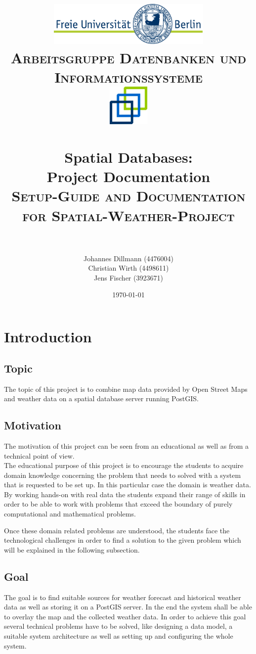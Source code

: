\documentclass[paper=a4, fontsize=11pt]{article} %
\title{
\normalfont \normalsize
\textsc{\includegraphics[width=0.6\textwidth]{pictures/logo} \\ [5pt] Arbeitsgruppe Datenbanken und Informationssysteme \\ [20pt] \includegraphics[width=0.15\textwidth]{pictures/DBIS_Logo_rgb_web.png}} \\ [10pt] %
\horrule{0.5pt} \\[0.4cm] %
\huge Spatial Databases:\\ Project Documentation \\ [0.15cm] %
\normalsize \textsc{Setup-Guide and Documentation for Spatial-Weather-Project} \\ [0.4cm]
\horrule{2pt} \\[0.5cm] %
}
\author{Johannes Dillmann (4476004) \\ Christian Wirth (4498611) \\ Jens Fischer (3923671)}
\date{\normalsize\today} %
\numberwithin{equation}{section} %
\numberwithin{figure}{section} %
\numberwithin{table}{section} %
\begin{document}
\begin{titlepage}
\maketitle
\thispagestyle{empty}
\end{titlepage}

\newpage
\setcounter{page}{1}
\tableofcontents

\newpage
\listoffigures
{}

\newpage
{}
\pagestyle{fancy}
\setcounter{page}{1}

\section{Introduction}
	\subsection*{Topic}
	The topic of this project is to combine map data provided by Open Street Maps and weather data on a spatial database server running PostGIS.
	\subsection*{Motivation}
	The motivation of this project can be seen from an educational as well as from a technical point of view.\\
	The educational purpose of this project is to encourage the students to acquire domain knowledge concerning the problem that needs to solved with a system that is requested to be set up. In this particular case the domain is weather data. By working hands-on with real data the students expand their range of skills in order to be able to work with problems that exceed the boundary of purely computational and mathematical problems. 
	
	Once these domain related problems are understood, the students face the technological challenges in order to find a solution to the given problem which will be explained in the following subsection.

	\subsection*{Goal}
	The goal is to find suitable sources for weather forecast and historical weather data as well as storing it on a PostGIS server. In the end the system shall be able to overlay the map and the collected weather data. In order to achieve this goal several technical problems have to be solved, like designing a data model, a suitable system architecture as well as setting up and configuring the whole system.
\end{document}
